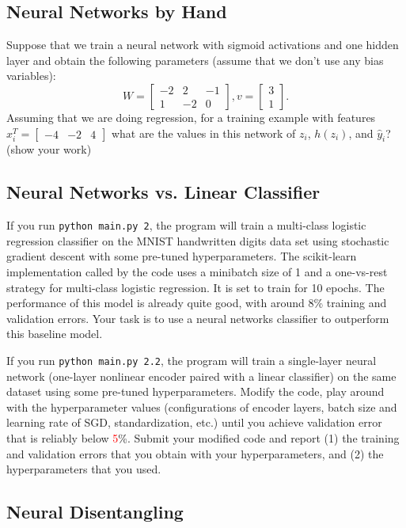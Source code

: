 \documentclass{article}
\newcommand{\blu}[1]{{\textcolor{blu}{#1}}}
\newcommand{\red}[1]{\textcolor{red}{#1}}
\let\ask\blu
\newcommand{\mat}[1]{\begin{bmatrix}#1\end{bmatrix}}
\begin{document}
\subsection{Neural Networks by Hand}

Suppose that we train a neural network with sigmoid activations and one hidden layer and obtain the following parameters (assume that we don't use any bias variables):
\[
W = \mat{-2 & 2 & -1\\1 & -2 & 0}, v = \mat{3 \\1}.
\]
\ask{Assuming that we are doing regression, for a training example with features $x_i^T = \mat{-4 &-2 & 4}$ what are the values in this network of $z_i$, $h(z_i)$, and $\hat{y}_i$? (show your work)}

\subsection{Neural Networks vs. Linear Classifier}

If you run \texttt{python main.py 2}, the program will train a multi-class logistic regression classifier on the MNIST handwritten digits data set using stochastic gradient descent with some pre-tuned hyperparameters.
The scikit-learn implementation called by the code uses a minibatch size of 1 and a one-vs-rest strategy for multi-class logistic regression. It is set to train for 10 epochs.
The performance of this model is already quite good, with around 8\% training and validation errors. Your task is to use a neural networks classifier to outperform this baseline model.

If you run \texttt{python main.py 2.2}, the program will train a single-layer neural network (one-layer nonlinear encoder paired with a linear classifier) on the same dataset using some pre-tuned hyperparameters. Modify the code, play around with the hyperparameter values (configurations of encoder layers, batch size and learning rate of SGD, standardization, etc.) until you achieve validation error that is reliably below \red{5}\%. \ask{Submit your modified code and report (1) the training and validation errors that you obtain with your hyperparameters, and (2) the hyperparameters that you used.}





\subsection{Neural Disentangling}
\end{document}
